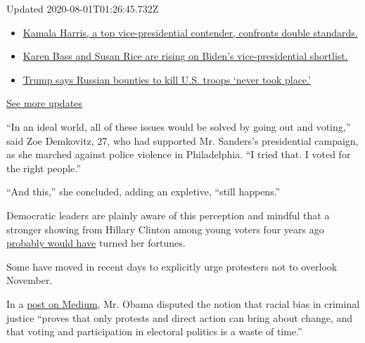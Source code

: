 Updated 2020-08-01T01:26:45.732Z

\begin{itemize}
\tightlist
\item
  \href{https://www.nytimes.com/2020/07/31/us/elections/biden-vs-trump.html?action=click\&pgtype=Article\&state=default\&region=MAIN_CONTENT_1\&context=storylines_live_updates\#link-29fdff45}{Kamala
  Harris, a top vice-presidential contender, confronts double
  standards.}
\item
  \href{https://www.nytimes.com/2020/07/31/us/elections/biden-vs-trump.html?action=click\&pgtype=Article\&state=default\&region=MAIN_CONTENT_1\&context=storylines_live_updates\#link-13ec3d9c}{Karen
  Bass and Susan Rice are rising on Biden's vice-presidential
  shortlist.}
\item
  \href{https://www.nytimes.com/2020/07/31/us/elections/biden-vs-trump.html?action=click\&pgtype=Article\&state=default\&region=MAIN_CONTENT_1\&context=storylines_live_updates\#link-49e9a016}{Trump
  says Russian bounties to kill U.S. troops `never took place.'}
\end{itemize}

\href{https://www.nytimes.com/2020/07/31/us/elections/biden-vs-trump.html?action=click\&pgtype=Article\&state=default\&region=MAIN_CONTENT_1\&context=storylines_live_updates}{See
more updates}

``In an ideal world, all of these issues would be solved by going out
and voting,'' said Zoe Demkovitz, 27, who had supported Mr. Sanders's
presidential campaign, as she marched against police violence in
Philadelphia. ``I tried that. I voted for the right people.''

``And this,'' she concluded, adding an expletive, ``still happens.''

Democratic leaders are plainly aware of this perception and mindful that
a stronger showing from Hillary Clinton among young voters four years
ago
\href{https://www.npr.org/2016/11/14/501727488/millennials-just-didnt-love-hillary-clinton-the-way-they-loved-barack-obama}{probably
would have} turned her fortunes.

Some have moved in recent days to explicitly urge protesters not to
overlook November.

In a
\href{https://medium.com/@BarackObama/how-to-make-this-moment-the-turning-point-for-real-change-9fa209806067}{post
on Medium}, Mr. Obama disputed the notion that racial bias in criminal
justice ``proves that only protests and direct action can bring about
change, and that voting and participation in electoral politics is a
waste of time.''


